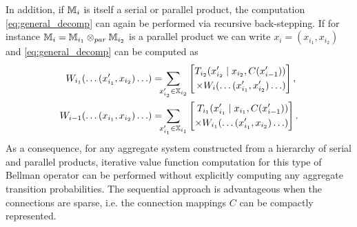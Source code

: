 \documentclass[draft,conference]{IEEEtran}
\begin{document}
In addition, if $\mathbb{M}_{i}$ is itself a serial or parallel product, the computation \eqref{eq:general_decomp} can again be performed via recursive back-stepping. If for instance $\mathbb{M}_{i} = \mathbb{M}_{i_1} \otimes_{par} \mathbb{M}_{i_2}$ is a parallel product we can write $x_i = (x_{i_1}, x_{i_2})$ and \eqref{eq:general_decomp} can be computed as
\begin{equation*}
\begin{aligned}
  W_{i_1}(\ldots (x_{i_1}', x_{i_2}) \ldots) & = \hspace{-2mm} \sum_{x_{i_2}'  \in \X_{i_2}} \left[ \begin{aligned} T_{i_2}(x_{i_2}' \mid x_{i_2}, C(x_{i-1}') ) \\ \times W_i(\ldots (x_{i_1}', x_{i_2}') \ldots) \end{aligned} \right], \\
  W_{i-1}(\ldots (x_{i_1}, x_{i_2}) \ldots)  & =  \hspace{-2mm} \sum_{x_{i_1}' \in \X_{i_1}} \left[ \begin{aligned} T_{i_1}(x_{i_1}' \mid x_{i_1}, C(x_{i-1}') ) \\
  	\times W_{i_1}(\ldots (x_{i_1}', x_{i_2}) \ldots)	
  \end{aligned} \right].
\end{aligned}
\end{equation*}
As a consequence, for any aggregate system constructed from a hierarchy of serial and parallel products, iterative value function computation for this type of Bellman operator can be performed without explicitly computing any aggregate transition probabilities. The sequential approach is advantageous when the connections are sparse, i.e. the connection mappings $C$ can be compactly represented.
\end{document}
